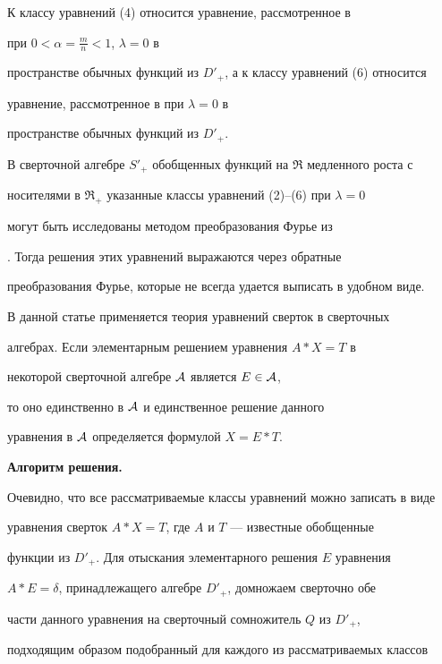 К классу уравнений (4) относится уравнение, рассмотренное в 


\cite{brak} при $0<\alpha =\frac{m}{n}<1$, $\lambda =0$ в


пространстве обычных функций из $D'_+$, а к классу уравнений (6) относится


уравнение, рассмотренное в \cite{cak} при $\lambda =0$ в


пространстве обычных функций из $D'_+$.





В сверточной алгебре $S'_+$ обобщенных функций на $\Re$ медленного роста с


носителями в $\Re_+$ указанные классы уравнений (2)--(6) при $\lambda =0$


могут быть исследованы методом преобразования Фурье из 


\cite{sam}. Тогда решения этих уравнений выражаются через обратные


преобразования Фурье, которые не всегда удается выписать в удобном виде.





В данной статье применяется теория уравнений сверток в сверточных


алгебрах. Если элементарным решением уравнения $ A\ast X=T$ в


некоторой сверточной алгебре $\cal A $ является $E\in {\cal A}$,


то оно единственно в $\cal A$ и единственное решение данного


уравнения в $\cal A$ определяется формулой $X=E\ast T$.


\medskip





{\bf Алгоритм решения.}


Очевидно, что все рассматриваемые классы уравнений можно записать в виде


уравнения сверток $ A\ast X=T$, где $A$ и $T$ --- известные обобщенные


функции из $D'_+$. Для отыскания элементарного решения $E$ уравнения


$A\ast E=\delta $, принадлежащего алгебре $D'_+$, домножаем сверточно обе


части данного уравнения на сверточный сомножитель $Q$ из $D'_+$,


подходящим образом подобранный для каждого из рассматриваемых классов


